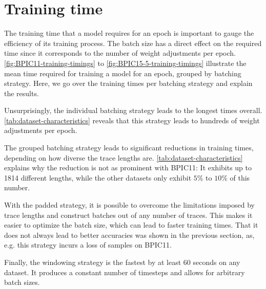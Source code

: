 \section{Training time}\label{sec:eval:training-time}
The training time that a model requires for an epoch is important to gauge the efficiency of its training process. The batch size has a direct effect on the required time since it corresponds to the number of weight adjustments per epoch. \autoref{fig:BPIC11-training-timings} to \autoref{fig:BPIC15-5-training-timings} illustrate the mean time required for training a model for an epoch, grouped by batching strategy. Here, we go over the training times per batching strategy and explain the results.

Unsurprisingly, the individual batching strategy leads to the longest times overall. \autoref{tab:dataset-characteristics} reveals that this strategy leads to hundreds of weight adjustments per epoch.

The grouped batching strategy leads to significant reductions in training times, depending on how diverse the trace lengths are. \autoref{tab:dataset-characteristics} explains why the reduction is not as prominent with BPIC11: It exhibits up to 1814 different lengths, while the other datasets only exhibit $5\%$ to $10\%$ of this number.

With the padded strategy, it is possible to overcome the limitations imposed by trace lengths and construct batches out of any number of traces. This makes it easier to optimize the batch size, which can lead to faster training times. That it does not always lead to better accuracies was shown in the previous section, as, e.g. this strategy incurs a loss of samples on BPIC11.

Finally, the windowing strategy is the fastest by at least 60 seconds on any dataset. It produces a constant number of timesteps and allows for arbitrary batch sizes.

